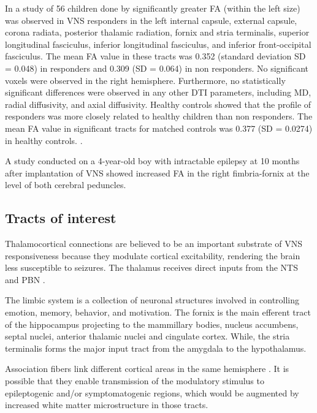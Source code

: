     In a study of 56 children done by \cite{Mithani2019} significantly greater FA (within the left size) was observed in VNS responders in the left internal capsule, external capsule, corona radiata, posterior thalamic radiation, fornix and stria terminalis, superior longitudinal fasciculus, inferior longitudinal fasciculus, and inferior front-occipital fasciculus. The mean FA value in these tracts was 0.352 (standard deviation SD = 0.048) in responders and 0.309 (SD = 0.064) in non responders. No significant voxels were observed in the right hemisphere. Furthermore, no statistically significant differences were observed in any other DTI parameters, including MD, radial diffusivity, and axial diffusivity. Healthy controls showed that the profile of responders was more closely related to healthy children than non responders. The mean FA value in significant tracts for matched controls was 0.377 (SD = 0.0274) in healthy controls. \cite{Mithani2019}.

    \noindent A study conducted on a 4-year-old boy with intractable epilepsy at 10 months after implantation of VNS showed increased FA in the right fimbria-fornix at the level of both cerebral peduncles. \cite{Fan2014}
  
  \subsection*{Tracts of interest}

    Thalamocortical connections are believed to be an important substrate of VNS responsiveness because they modulate cortical excitability, rendering the brain less susceptible to seizures. The thalamus receives direct inputs from the NTS and PBN \cite{BecksteadJoel2980}.

    The limbic system is a collection of neuronal structures involved in controlling emotion, memory, behavior, and motivation. The fornix is the main efferent tract of the hippocampus projecting to the mammillary bodies, nucleus accumbens, septal nuclei, anterior thalamic nuclei and cingulate cortex. While, the stria terminalis forms the major input tract from the amygdala to the hypothalamus.
    
    Association fibers link different cortical areas in the same hemisphere \cite{standring2005gray}. It is possible that they enable transmission of the modulatory stimulus to epileptogenic and/or symptomatogenic regions, which would be augmented by increased white matter microstructure in those tracts.

